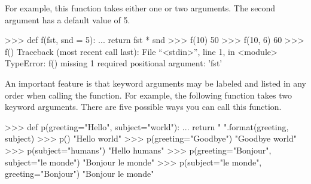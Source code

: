 \documentclass[11pt]{cselabheader}
\begin{document}
For example, this function takes either one or two arguments. The second
argument has a default value of 5.

\begin{pyconcode}
>>> def f(fst, snd = 5):
...    return fst * snd
>>> f(10)
50
>>> f(10, 6)
60
>>> f()
Traceback (most recent call last):
  File ``<stdin>'', line 1, in <module>
TypeError: f() missing 1 required positional argument: 'fst'
\end{pyconcode}

An important feature is that keyword arguments may be labeled
and listed in any order when calling the function. For example,
the following function takes two keyword arguments. There are five
possible ways you can call this function.

\begin{pyconcode}
>>> def p(greeting="Hello", subject="world"):
...     return "{} {}".format(greeting, subject)
>>> p()
"Hello world"
>>> p(greeting="Goodbye")
"Goodbye world"
>>> p(subject="humans")
"Hello humans"
>>> p(greeting="Bonjour", subject="le monde")
"Bonjour le monde"
>>> p(subject="le monde", greeting="Bonjour")
"Bonjour le monde"
\end{pyconcode}
\end{document}
